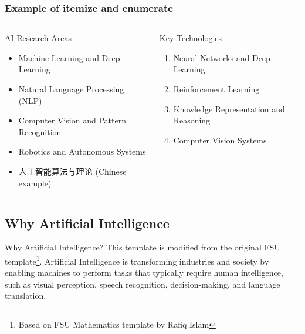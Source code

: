 \documentclass{ctexbeamer}
\begin{document}
\begin{frame}
    \frametitle{Example of itemize and enumerate}
    \begin{columns}[c, onlytextwidth]
        \begin{column}{0.48\textwidth}
            \small
            \begin{block}{AI Research Areas}
                \begin{itemize}
                    \item Machine Learning and Deep Learning
                    \item Natural Language Processing (NLP)
                    \item Computer Vision and Pattern Recognition
                    \item Robotics and Autonomous Systems
                    \item 人工智能算法与理论 (Chinese example)
                \end{itemize}
            \end{block}
        \end{column}
        \begin{column}{0.48\textwidth}
            \begin{block}{Key Technologies}
                \begin{enumerate}
                    \item Neural Networks and Deep Learning
                    \item Reinforcement Learning
                    \item Knowledge Representation and Reasoning
                    \item Computer Vision Systems
                \end{enumerate}
            \end{block}
        \end{column}
    \end{columns}
\end{frame}
\subsection{Why Artificial Intelligence}
\begin{frame}{Why Artificial Intelligence?}
This template is modified from the original FSU template\footnote{Based on FSU Mathematics template by Rafiq Islam}. Artificial Intelligence is transforming industries and society by enabling machines to perform tasks that typically require human intelligence, such as visual perception, speech recognition, decision-making, and language translation.
\end{frame}
\end{document}
